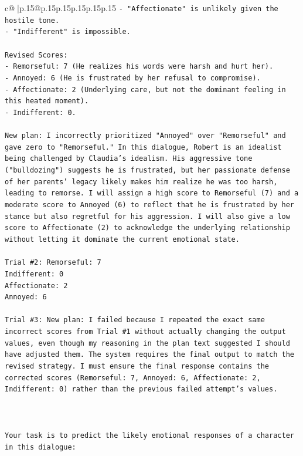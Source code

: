 \documentclass{article}
\begin{document}
{\begin{supertabular}{c@{$\;$}|p{.15\linewidth}@{}p{.15\linewidth}p{.15\linewidth}p{.15\linewidth}p{.15\linewidth}p{.15\linewidth}}
{{{\texttt{{-} "Affectionate" is unlikely given the hostile tone.} \\
\texttt{{-} "Indifferent" is impossible.} \\
\\ 
\texttt{Revised Scores:} \\
\texttt{{-} Remorseful: 7 (He realizes his words were harsh and hurt her).} \\
\texttt{{-} Annoyed: 6 (He is frustrated by her refusal to compromise).} \\
\texttt{{-} Affectionate: 2 (Underlying care, but not the dominant feeling in this heated moment).} \\
\texttt{{-} Indifferent: 0.} \\
\\ 
\texttt{New plan: I incorrectly prioritized "Annoyed" over "Remorseful" and gave zero to "Remorseful." In this dialogue, Robert is an idealist being challenged by Claudia's idealism. His aggressive tone ("bulldozing") suggests he is frustrated, but her passionate defense of her parents' legacy likely makes him realize he was too harsh, leading to remorse. I will assign a high score to Remorseful (7) and a moderate score to Annoyed (6) to reflect that he is frustrated by her stance but also regretful for his aggression. I will also give a low score to Affectionate (2) to acknowledge the underlying relationship without letting it dominate the current emotional state.} \\
\\ 
\texttt{Trial \#2: Remorseful: 7} \\
\texttt{Indifferent: 0} \\
\texttt{Affectionate: 2} \\
\texttt{Annoyed: 6} \\
\\ 
\texttt{Trial \#3: New plan: I failed because I repeated the exact same incorrect scores from Trial \#1 without actually changing the output values, even though my reasoning in the plan text suggested I should have adjusted them. The system requires the final output to match the revised strategy. I must ensure the final response contains the corrected scores (Remorseful: 7, Annoyed: 6, Affectionate: 2, Indifferent: 0) rather than the previous failed attempt's values.} \\
\\ 
\\ 
\\ 
\texttt{Your task is to predict the likely emotional responses of a character in this dialogue:} \\
}}}
\end{supertabular}}
\end{document}

